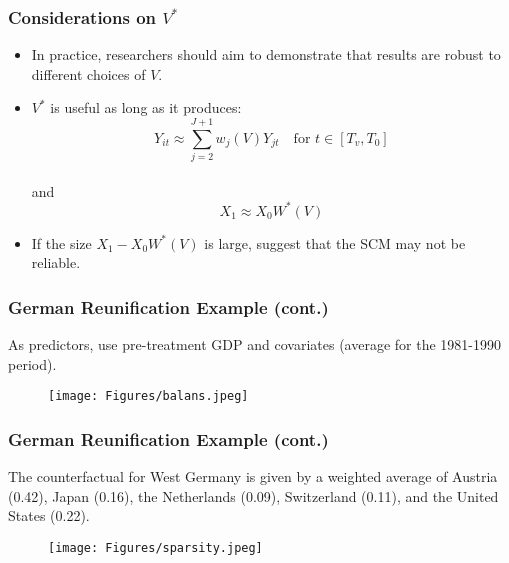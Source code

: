 \documentclass[xcolor=svgnames,t]{beamer}
\begin{document}
\begin{frame}
    \frametitle{Considerations on \(V^*\)}
    \begin{itemize} 
        \item<1-> In practice, researchers should aim to demonstrate that results are robust to different choices of \(V\).
        \item<2-> \(V^*\) is useful as long as it produces:
        \[
        Y_{it} \approx \sum_{j=2}^{J+1} w_j(V) Y_{jt} \quad \text{for } t \in [T_v, T_0]
        \]\\
        and\\
        \[X_1 \approx X_0 W^*(V)\]
        \item<3-> If the size $X_1 - X_0 W^*(V)$ is large, \cite{abadie2010synthetic} suggest that the SCM may not be reliable.
        
    \end{itemize}
\end{frame}

\begin{frame}
    \frametitle{German Reunification Example (cont.)}
    As predictors, use pre-treatment GDP and covariates (average for the 1981-1990 period).
    \begin{figure}[htbp]
        \centering
        \texttt{[image: Figures/balans.jpeg]}
        \label{fig:figure2}
    \end{figure}
\end{frame}

\begin{frame}
    \frametitle{German Reunification Example (cont.)}
    The counterfactual for West Germany is given by a weighted average of Austria (0.42), Japan (0.16), the Netherlands (0.09), Switzerland (0.11), and the United States (0.22).
    \begin{figure}[htbp]
        \centering
        \texttt{[image: Figures/sparsity.jpeg]}
        \label{fig:figure3}
    \end{figure}
\end{frame}
\end{document}
